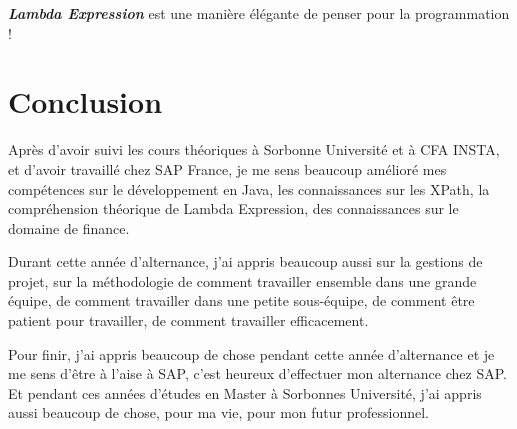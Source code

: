     \par \textit{\textbf{Lambda Expression}} est une manière élégante de penser pour la programmation ! 
    
\newpage
\section{Conclusion}
Après d'avoir suivi les cours théoriques à Sorbonne Université et à CFA INSTA, et d'avoir travaillé chez SAP France, je me sens beaucoup amélioré mes compétences sur le développement en Java, les connaissances sur les XPath, la compréhension théorique de Lambda Expression, des connaissances sur le domaine de finance.

\par Durant cette année d'alternance, j'ai appris beaucoup aussi sur la gestions de projet, sur la méthodologie de comment travailler ensemble dans une grande équipe, de comment travailler dans une petite sous-équipe, de comment être patient pour travailler, de comment travailler efficacement.

\par Pour finir, j'ai appris beaucoup de chose pendant cette année d'alternance et je me sens d'être à l'aise à SAP, c'est heureux d'effectuer mon alternance chez SAP. Et pendant ces années d'études en Master à Sorbonnes Université, j'ai appris aussi beaucoup de chose, pour ma vie, pour mon futur professionnel.


\newpage

